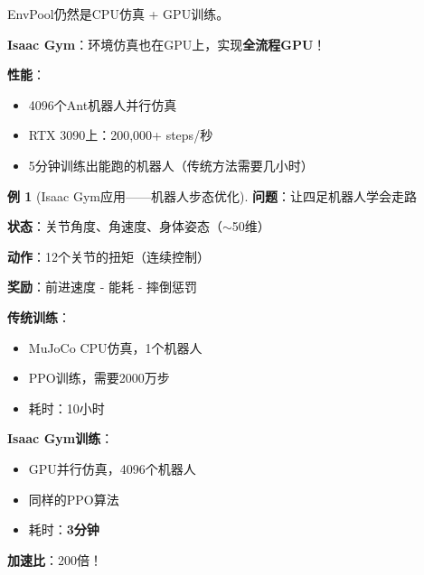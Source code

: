 \documentclass[11pt,a4paper]{article}
\theoremstyle{definition}
\newtheorem{example}{例}[section]
\begin{document}
\begin{plainwords}
EnvPool仍然是CPU仿真 + GPU训练。

\textbf{Isaac Gym}：环境仿真也在GPU上，实现\textbf{全流程GPU}！
\end{plainwords}

\begin{keypoint}
\begin{center}
\end{center}

\textbf{性能}：
\begin{itemize}
    \item 4096个Ant机器人并行仿真
    \item RTX 3090上：200,000+ steps/秒
    \item 5分钟训练出能跑的机器人（传统方法需要几小时）
\end{itemize}
\end{keypoint}

\begin{example}[Isaac Gym应用——机器人步态优化]
\textbf{问题}：让四足机器人学会走路

\textbf{状态}：关节角度、角速度、身体姿态（$\sim$50维）

\textbf{动作}：12个关节的扭矩（连续控制）

\textbf{奖励}：前进速度 - 能耗 - 摔倒惩罚

\textbf{传统训练}：
\begin{itemize}
    \item MuJoCo CPU仿真，1个机器人
    \item PPO训练，需要2000万步
    \item 耗时：10小时
\end{itemize}

\textbf{Isaac Gym训练}：
\begin{itemize}
    \item GPU并行仿真，4096个机器人
    \item 同样的PPO算法
    \item 耗时：\textbf{3分钟}
\end{itemize}

\textbf{加速比}：200倍！
\end{example}
\end{document}
